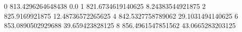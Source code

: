 0 813.4296264648438 0.0
1 821.6734619140625 8.24383544921875
2 825.9169921875 12.48736572265625
4 842.5327758789062 29.1031494140625
6 853.0890502929688 39.659423828125
8 856.4961547851562 43.0665283203125
